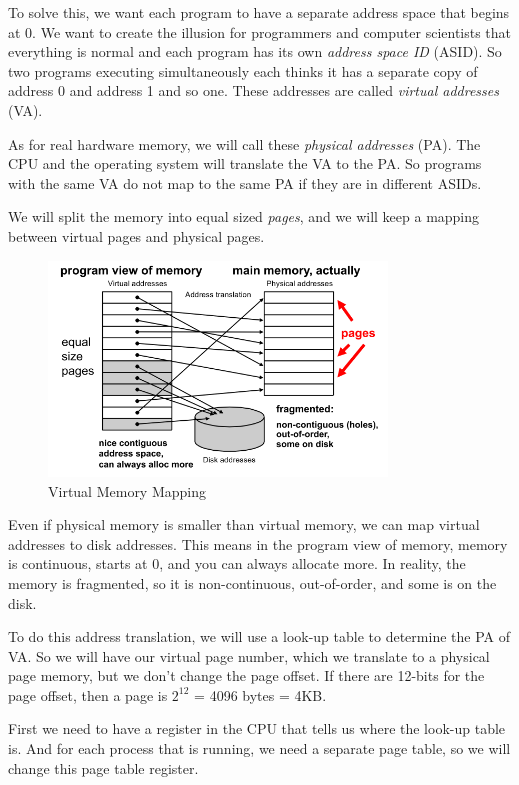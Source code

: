 \documentclass{article}
\begin{document}
To solve this, we want each program to have a separate address space that begins at 0. We want to create the illusion for programmers and computer scientists that everything is normal and each program has its own \textit{address space ID} (ASID). So two programs executing simultaneously each thinks it has a separate copy of address 0 and address 1 and so one. These addresses are called \textit{virtual addresses} (VA).

As for real hardware memory, we will call these \textit{physical addresses} (PA). The CPU and the operating system will translate the VA to the PA. So programs with the same VA do not map to the same PA if they are in different ASIDs. 

We will split the memory into equal sized \textit{pages}, and we will keep a mapping between virtual pages and physical pages. 

\begin{figure}[ht!]
\centering
\includegraphics[width=90mm]{img/vm.png}
\caption{Virtual Memory Mapping}
\end{figure}

Even if physical memory is smaller than virtual memory, we can map virtual addresses to disk addresses. This means in the program view of memory, memory is continuous, starts at 0, and you can always allocate more. In reality, the memory is fragmented, so it is non-continuous, out-of-order, and some is on the disk.

To do this address translation, we will use a look-up table to determine the PA of VA. So we will have our virtual page number, which we translate to a physical page memory, but we don't change the page offset. If there are 12-bits for the page offset, then a page is $2^{12}$ = 4096 bytes = 4KB. 

First we need to have a register in the CPU that tells us where the look-up table is. And for each process that is running, we need a separate page table, so we will change this page table register.
\end{document}
